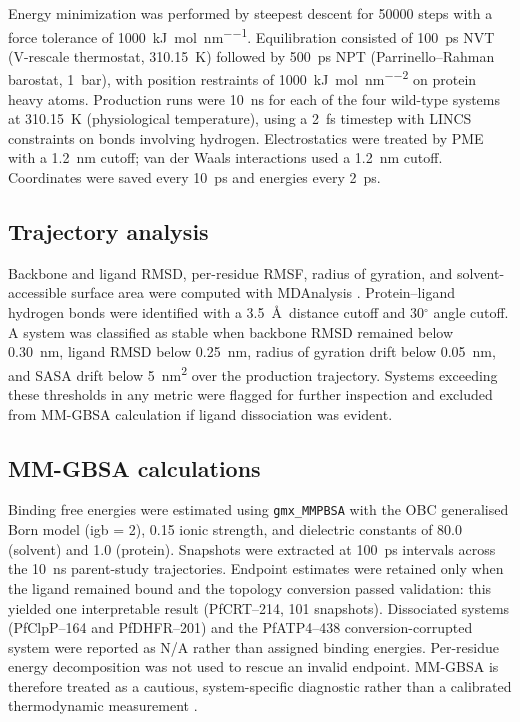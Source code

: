 \documentclass[11pt,a4paper]{article}
\begin{document}
Energy minimization was performed by steepest descent for \num{50000} steps with a force tolerance of \SI{1000}{\kilo\joule\per\mole\per\nano\metre}. Equilibration consisted of \SI{100}{\pico\second} NVT (V-rescale thermostat, \SI{310.15}{\kelvin}) followed by \SI{500}{\pico\second} NPT (Parrinello--Rahman barostat, \SI{1}{\bar}), with position restraints of \SI{1000}{\kilo\joule\per\mole\per\nano\metre\squared} on protein heavy atoms. Production runs were \SI{10}{\nano\second} for each of the four wild-type systems at \SI{310.15}{\kelvin} (physiological temperature), using a \SI{2}{\femto\second} timestep with LINCS constraints on bonds involving hydrogen. Electrostatics were treated by PME with a \SI{1.2}{\nano\metre} cutoff; van der Waals interactions used a \SI{1.2}{\nano\metre} cutoff. Coordinates were saved every \SI{10}{\pico\second} and energies every \SI{2}{\pico\second}.

\subsection{Trajectory analysis}

Backbone and ligand RMSD, per-residue RMSF, radius of gyration, and solvent-accessible surface area were computed with MDAnalysis \citep{mdanalysis_2011}. Protein--ligand hydrogen bonds were identified with a \SI{3.5}{\angstrom}\ distance cutoff and 30$^\circ$ angle cutoff. A system was classified as stable when backbone RMSD remained below \SI{0.30}{\nano\metre}, ligand RMSD below \SI{0.25}{\nano\metre}, radius of gyration drift below \SI{0.05}{\nano\metre}, and SASA drift below \SI{5}{\nano\metre\squared} over the production trajectory. Systems exceeding these thresholds in any metric were flagged for further inspection and excluded from MM-GBSA calculation if ligand dissociation was evident.

\subsection{MM-GBSA calculations}

Binding free energies were estimated using \texttt{gmx\_MMPBSA} with the OBC generalised Born model (igb = 2), \SI{0.15}{\molar} ionic strength, and dielectric constants of 80.0 (solvent) and 1.0 (protein). Snapshots were extracted at \SI{100}{\pico\second} intervals across the \SI{10}{\nano\second} parent-study trajectories. Endpoint estimates were retained only when the ligand remained bound and the topology conversion passed validation: this yielded one interpretable result (PfCRT--214, \num{101} snapshots). Dissociated systems (PfClpP--164 and PfDHFR--201) and the PfATP4--438 conversion-corrupted system were reported as N/A rather than assigned binding energies. Per-residue energy decomposition was not used to rescue an invalid endpoint. MM-GBSA is therefore treated as a cautious, system-specific diagnostic rather than a calibrated thermodynamic measurement \citep{gmx_mmpbsa_2021, mmgbsa_best_practices_2025}.
\end{document}
